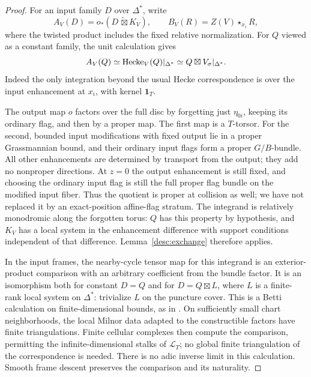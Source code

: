 \begin{proof}
For an input family $D$ over $\Delta^*$, write
\[
 A_V(D)=o_*(D\,\widetilde\boxtimes K_V),
                 \qquad B_V(R)=Z(V)\star_{x_i}R,
\]
where the twisted product includes the fixed relative normalization.
For $Q$ viewed as a constant family, the unit calculation gives
\begin{equation}\label{desc:punctured-action}
 A_V(Q)\simeq\operatorname{Hecke}_V(Q)|_{\Delta^*}
                    \simeq Q\boxtimes V_\sigma|_{\Delta^*}.
\end{equation}
Indeed the only integration beyond the usual Hecke correspondence
is over the input enhancement at $x_i$, with kernel $\mathbf1_T$.

The output map $o$ factors over the full disc by forgetting just
$\eta_{0i}$, keeping its ordinary flag, and then by a proper map.
The first map is a $T$-torsor.  For the second, bounded input
modifications with fixed output lie in a proper Grassmannian bound,
and their ordinary input flags form a proper $G/B$-bundle.  All
other enhancements are determined by transport from the output;
they add no nonproper directions.  At $z=0$ the output enhancement
is still fixed, and choosing the ordinary input flag is still the
full proper flag bundle on the modified input fiber.  Thus the
quotient is proper at collision as well; we have not replaced it
by an exact-position affine-flag stratum.
The integrand is relatively monodromic along the forgotten torus:
$Q$ has this property by hypothesis, and $K_V$ has a local system in
the enhancement difference with support conditions independent of
that difference.  Lemma~\ref{desc:exchange} therefore applies.

In the input frames, the nearby-cycle tensor map for this integrand
is an exterior-product comparison with an arbitrary coefficient
from the bundle factor.  It is an isomorphism both for constant
$D=Q$ and for $D=Q\boxtimes L$, where $L$ is a finite-rank local
system on $\Delta^*$: trivialize $L$ on the puncture cover.  This is
a Betti calculation on finite-dimensional bounds, as in
\cite[Lemma~7.4]{CT}.  On sufficiently small chart neighborhoods,
the local Milnor data
adapted to the constructible factors have finite triangulations.
Finite cellular complexes then compute the comparison, permitting
the infinite-dimensional stalks of $\mathscr L_T$; no global finite
triangulation of the correspondence is needed.  There is no adic
inverse limit in this calculation.  Smooth frame descent preserves
the comparison and its naturality.


\end{proof}
